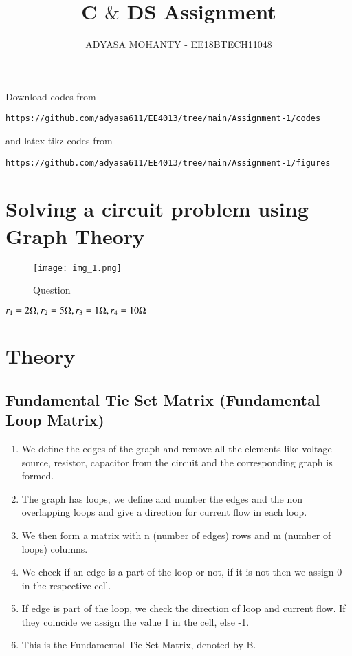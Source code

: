 \documentclass[journal,12pt,twocolumn]{IEEEtran}
\begin{document}
     \def\rightbox#1{\makebox[0in][r]{#1}}
     \def\centbox#1{\makebox[0in]{#1}}
     \def\topbox#1{\raisebox{-\baselineskip}[0in][0in]{#1}}
     \def\midbox#1{\raisebox{-0.5\baselineskip}[0in][0in]{#1}}
\vspace{3cm}
\title{C $\&$ DS Assignment}
\author{ADYASA MOHANTY - EE18BTECH11048}
\maketitle
\newpage
\bigskip
\renewcommand{\thefigure}{\theenumi}
\renewcommand{\thetable}{\theenumi}
Download codes from 
\begin{lstlisting}
https://github.com/adyasa611/EE4013/tree/main/Assignment-1/codes
\end{lstlisting}
%
and latex-tikz codes from 
%
\begin{lstlisting}
https://github.com/adyasa611/EE4013/tree/main/Assignment-1/figures
\end{lstlisting}
\section{\textbf{Solving a circuit problem using Graph Theory}}
 

\begin{figure}[h!]
    \centering
    \texttt{[image: img\_1.png]}
    \caption{Question}
    \label{fig:Question}
\end{figure}
$r_1=2 \ohm, r_2=5 \ohm, r_3=1 \ohm,r_4=10 \ohm$

\section{\textbf{Theory}}


\subsection{Fundamental Tie Set Matrix (Fundamental Loop Matrix)}

\begin{enumerate}
\item We define the edges of the graph and remove all the elements like voltage source, resistor, capacitor from the circuit and the corresponding graph is formed.

\item The graph has loops, we define and number the edges and the non overlapping loops and give a direction for current flow in each loop.

\item We then form a matrix with n (number of edges) rows and m (number of loops) columns.
\item We check if an edge is a part of the loop or not, if it is not then we assign 0 in the respective cell.
\item If edge is part of the loop, we check the direction of loop and current flow. If they coincide we assign the value 1 in the cell, else -1.
\item This is the Fundamental Tie Set Matrix, denoted by B.
\end{enumerate}
\end{document}
